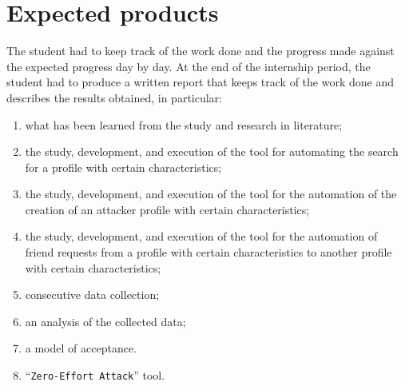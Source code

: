 \section{Expected products}
The student had to keep track of the work done and the progress made against the expected progress day by day. At the end of the internship period, the student had to produce a written report that keeps track of the work done and describes the results obtained, in particular:
\begin{enumerate}
	\item what has been learned from the study and research in literature; 
	\item the study, development, and execution of the tool for automating the search for a profile with certain characteristics;
	\item the study, development, and execution of the tool for the automation of the creation of an attacker profile with certain characteristics;
	\item the study, development, and execution of the tool for the automation of friend requests from a profile with certain characteristics to another profile with certain characteristics;	
	\item consecutive data collection; 
	\item an analysis of the collected data; 
	\item a model of acceptance.
	\item ``\texttt{Zero-Effort Attack}'' tool.
\end{enumerate}

